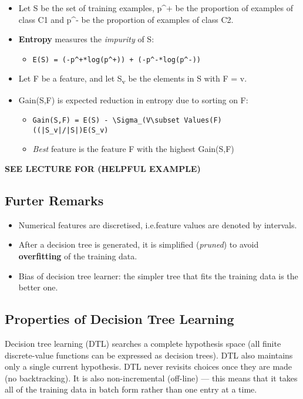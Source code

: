\documentclass[11pt]{article}
\begin{document}
\begin{itemize}
\item Let S be the set of training examples, p\^{}+ be the proportion of examples of class C1 and p\^{}- be the proportion of examples of class C2.
\item \textbf{Entropy} measures the \emph{impurity} of S:
\begin{itemize}
\item \texttt{E(S) = (-p\textasciicircum{}+*log(p\textasciicircum{}+)) + (-p\textasciicircum{}-*log(p\textasciicircum{}-))}
\end{itemize}
\item Let F be a feature, and let S\textsubscript{v} be the elements in S with F = v.
\item Gain(S,F) is expected reduction in entropy due to sorting on F:
\begin{itemize}
\item \texttt{Gain(S,F) = E(S) - \textbackslash{}Sigma\_(V\textbackslash{}subset Values(F) ((|S\_v|/|S|)E(S\_v)}
\item \emph{Best} feature is the feature F with the highest Gain(S,F)
\end{itemize}
\end{itemize}

\textbf{SEE LECTURE FOR (HELPFUL EXAMPLE)}

\subsection{Furter Remarks}
\label{sec:orgc8787e9}
\begin{itemize}
\item Numerical features are discretised, i.e.feature values are denoted by intervals.
\item After a decision tree is generated, it is simplified (\emph{pruned}) to avoid \textbf{overfitting} of the training data.
\item Bias of decision tree learner: the simpler tree that fits the training data is the better one.
\end{itemize}

\subsection{Properties of Decision Tree Learning}
\label{sec:org615fbe8}
Decision tree learning (DTL) searches a complete hypothesis space (all finite discrete-value functions can be expressed as decision trees).
DTL also maintains only a single current hypothesis.
DTL never revisits choices once they are made (no backtracking).
It is also non-incremental (off-line) --- this means that it takes all of the training data in batch form rather than one entry at a time.
\end{document}
